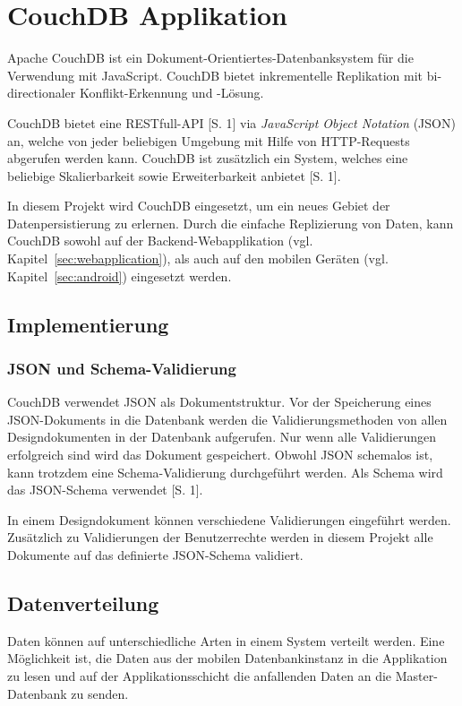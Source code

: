 \section{CouchDB Applikation}
\label{sec:couchdb}

Apache CouchDB ist ein Dokument-Orientiertes-Datenbanksystem für die Verwendung
	mit JavaScript. CouchDB bietet inkrementelle Replikation mit bi-directionaler
	Konflikt-Erkennung und -Lösung.
	
CouchDB bietet eine RESTfull-API \cite{Fowler10}[S. 1] via \emph{JavaScript Object
	Notation} (JSON) an, welche von jeder beliebigen Umgebung mit Hilfe von
	HTTP-Requests abgerufen werden kann. CouchDB ist zusätzlich ein System, welches
	eine beliebige Skalierbarkeit sowie Erweiterbarkeit anbietet
	\cite{CouchDB11}[S. 1].
	
In diesem Projekt wird CouchDB eingesetzt, um ein neues Gebiet der
	Datenpersistierung zu erlernen. Durch die einfache Replizierung von Daten,
	kann CouchDB sowohl auf der Backend-Webapplikation (vgl.
	Kapitel~\ref{sec:webapplication}), als auch auf den mobilen Geräten (vgl.
	Kapitel~\ref{sec:android}) eingesetzt werden.

\subsection{Implementierung}

\subsubsection{JSON und Schema-Validierung}
CouchDB verwendet JSON als Dokumentstruktur. Vor der Speicherung eines
	JSON-Dokuments in die Datenbank werden die Validierungsmethoden von allen
	Designdokumenten in der Datenbank aufgerufen. Nur wenn alle Validierungen
	erfolgreich sind wird das Dokument gespeichert. Obwohl JSON schemalos ist,
	kann trotzdem eine Schema-Validierung durchgeführt werden. Als Schema wird
	das JSON-Schema verwendet \cite{IETF11}[S. 1]. 

In einem Designdokument können verschiedene Validierungen eingeführt werden.
	Zusätzlich zu Validierungen der Benutzerrechte werden in diesem Projekt alle
	Dokumente auf das definierte JSON-Schema validiert.

\subsection{Datenverteilung}

Daten können auf unterschiedliche Arten in einem System verteilt werden. Eine
	Möglichkeit ist, die Daten aus der mobilen Datenbankinstanz in die Applikation
	zu lesen und auf der Applikationsschicht die anfallenden Daten an die
	Master-Datenbank zu senden.

